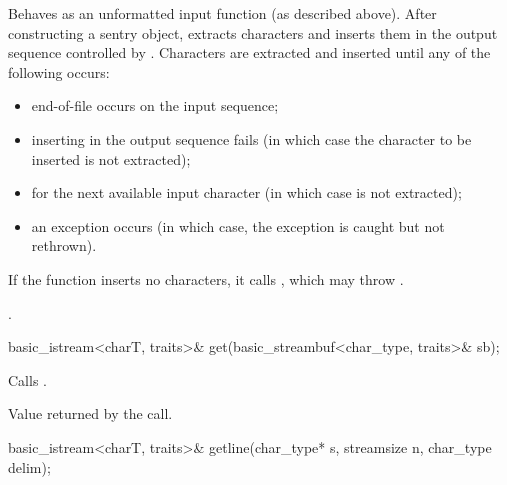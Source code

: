 \begin{itemdescr}
\pnum
\effects
Behaves as an unformatted input function
(as described above).
After constructing a sentry object, extracts
characters and inserts them
in the output sequence controlled by
.
Characters are extracted and inserted until any of the following occurs:
\begin{itemize}
\item
end-of-file occurs on the input sequence;
\item
inserting in the output sequence fails
(in which case the character to be inserted is not extracted);
\item
{} for the next available input
character 
(in which case  is not extracted);
\item
an exception occurs
(in which case, the exception is caught but not rethrown).
\end{itemize}

\pnum
If the function inserts no characters, it calls
,
which may throw
.

\pnum
\returns
{}.
\end{itemdescr}

%
\begin{itemdecl}
basic_istream<charT, traits>& get(basic_streambuf<char_type, traits>& sb);
\end{itemdecl}

\begin{itemdescr}
\pnum
\effects
Calls
.

\pnum
\returns
Value returned by the call.
\end{itemdescr}

%
\begin{itemdecl}
basic_istream<charT, traits>& getline(char_type* s, streamsize n, char_type delim);
\end{itemdecl}

